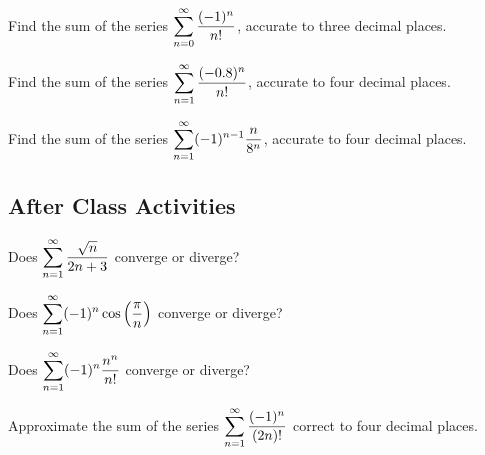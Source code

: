\documentclass[notes]{subfiles}
\begin{document}
		\begin{ex}
			Find the sum of the series $\displaystyle \sum_{n=0}^\infty \dfrac{(-1)^n}{n!}$, accurate to three decimal places.
		\end{ex}
			
		\begin{ex}
			Find the sum of the series $\displaystyle \sum_{n=1}^\infty \dfrac{(-0.8)^n}{n!}$, accurate to four decimal places.
		\end{ex}
			
		\begin{ex}
			Find the sum of the series $\displaystyle \sum_{n=1}^\infty (-1)^{n-1} \dfrac{n}{8^n}$, accurate to four decimal places.
		\end{ex}
			\newpage
			
	\subsection*{After Class Activities}
		\begin{ex}
			Does $\displaystyle \sum_{n=1}^\infty \dfrac{\sqrt{n}}{2n+3}$ converge or diverge?
		\end{ex}	
			
		\begin{ex}
			Does $\displaystyle \sum_{n=1}^\infty (-1)^n\cos\left( \dfrac{\pi}{n}\right)$ converge or diverge?
		\end{ex}
			
		\begin{ex}
			Does $\displaystyle \sum_{n=1}^\infty (-1)^n \dfrac{n^n}{n!}$ converge or diverge?
		\end{ex}
			
		\begin{ex}
			Approximate the sum of the series $\displaystyle \sum_{n=1}^\infty \dfrac{(-1)^n}{(2n)!}$ correct to four decimal places.
		\end{ex}
\clearpage
\end{document}
